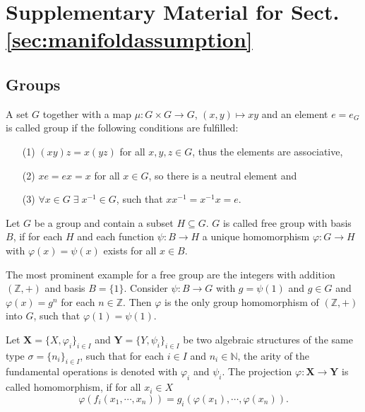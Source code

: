 \documentclass[envcountsect,runningheads]{llncs}
\begin{document}
\section{Supplementary Material for Sect. \ref{sec:manifoldassumption}}
\label{a:mannilliegroup}
\subsection{Groups}
\label{a:groups}
\begin{definition}
A set $G$ together with a map $\mu: G \times G \rightarrow G$, $(x,y) \mapsto xy$ and an element $e = e_G$ is called group if the following conditions are fulfilled:
\begin{enumerate}
	\item[(1)] $(xy)z = x(yz)$ for all $x,y,z \in G$, thus the elements are associative,
	\item[(2)] $xe = ex = x$ for all $x \in G$, so there is a neutral element and
	\item[(3)] $\forall x \in G \; \exists \; x^{-1} \in G$, such that $xx^{-1} = x^{-1}x = e$. 
\end{enumerate}
\end{definition}

\begin{definition}{\cite[p.~196]{hilton2012course}}
Let $G$ be a group and contain a subset $H \subseteq G$. $G$ is called free group with basis $B$, if for each $H$ and each function $\psi: B \rightarrow H$ a unique homomorphism $\varphi: G \rightarrow H$ with $\varphi(x) = \psi(x)$ exists for all $x \in B$.
\end{definition}

\begin{example}
The most prominent example for a free group are the integers with addition $(\mathbb{Z},+)$ and basis $B = \{1\}$. Consider $\psi: B \rightarrow G$ with $g = \psi(1)$ and $g \in G$ and $\varphi(x) = g^n$ for each $n \in \mathbb{Z}$. Then $\varphi$ is the only group homomorphism of $(\mathbb{Z},+)$ into $G$, such that $\varphi(1)=\psi(1)$.
\end{example}

\begin{definition}
Let $\textbf{X} = \{X,\varphi_i\}_{i \in I}$ and $\textbf{Y} = \{Y,\psi_i\}_{i \in I}$ be two algebraic structures of the same type $\sigma = \{n_i\}_{i\in I}$, such that for each $i \in I$ and $n_i \in \mathbb{N}$, the arity of the fundamental operations is denoted with $\varphi_i$ and $\psi_i$. The projection $\varphi: \textbf{X} \rightarrow \textbf{Y}$ is called homomorphism, if for all $x_{i} \in X$
\begin{equation}
\varphi\left(f_i\left(x_{1},\cdots,x_{n}\right)\right) = g_i\left(\varphi\left(x_{1}\right),\cdots,\varphi\left(x_{n}\right)\right).
\end{equation}
\end{definition}
\end{document}
